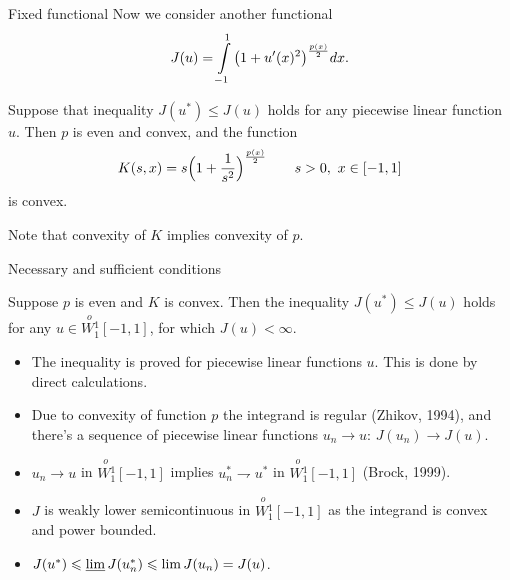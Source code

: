 \documentclass{beamer}\usepackage[]{graphicx}\usepackage[]{color}
\renewcommand{\le}{\leqslant}
\newcommand{\Wf}{\stackrel{o\ }{W{}_1^1}}
\begin{document}
\begin{frame}{Fixed functional}
Now we consider another functional
{\large
\begin{equation*}
J(u) = \int\limits_{-1}^1 \big(1 + u'(x)^2 \big)^{p(x) \over 2} dx.
\label{func}
\end{equation*}
}

\begin{theorem}
Suppose that inequality $J(u^*) \le J(u)$ holds for any piecewise linear function $u$.
Then $p$ is even and convex,
and the function
$$K(s, x) = s \Big( 1 + { 1 \over s^2 } \Big)^{p(x) \over 2} \qquad s > 0,\ x \in [-1, 1]$$
is convex.
\end{theorem}

Note that convexity of $K$ implies convexity of $p$.

\end{frame}


\begin{frame}{Necessary and sufficient conditions}

\vskip -0.5cm

\begin{theorem}
Suppose $p$ is even and $K$ is convex.
Then the inequality $J(u^*) \le J(u)$ holds for any $u \in \Wf[-1, 1]$, for which $J(u) < \infty$.
\end{theorem}

\begin{itemize}
\item The inequality is proved for piecewise linear functions $u$.
This is done by direct calculations.

\item Due to convexity of function $p$ the integrand is regular (Zhikov, 1994),
and there's a sequence of piecewise linear functions $u_n \to u$: $J(u_n) \to J(u)$.

\item $u_n \to u$ in $\Wf[-1, 1]$ implies $u_n^* \rightharpoondown u^*$ in $\Wf[-1, 1]$ (Brock, 1999).

\item $J$ is weakly lower semicontinuous in $\Wf[-1, 1]$ as the integrand is convex and power bounded.

\item $J(u^*) \le \varliminf J(u_n^*) \le \lim J(u_n) = J(u)$.
\end{itemize}

\end{frame}
\end{document}
